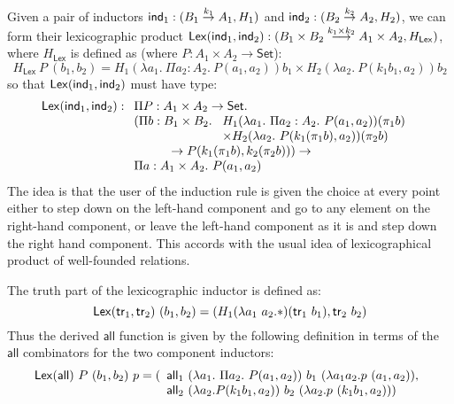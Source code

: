 \documentclass{amsart}
\newcommand{\Set}{\mathsf{Set}}
\begin{document}
Given a pair of inductors $\mathsf{ind}_1 : (B_1 \stackrel{k_1}\to A_1, H_1)$
and $\mathsf{ind}_2 : (B_2 \stackrel{k_2}\to A_2, H_2)$, we can form their
lexicographic product $\mathsf{Lex}(\mathsf{ind}_1, \mathsf{ind}_2) : (B_1 \times B_2
\stackrel{k_1 \times k_2}\longrightarrow A_1 \times A_2,
H_{\mathsf{Lex}})$, where $H_{\mathsf{Lex}}$ is defined as (where $P :
A_1 \times A_2 \to \Set$):
\begin{displaymath}
  H_{\mathsf{Lex}}\ P\ (b_1, b_2) = H_1(\lambda a_1.\ \Pi a_2 : A_2.\ P(a_1, a_2))b_1 \times H_2(\lambda a_2.\ P(k_1 b_1, a_2))b_2
\end{displaymath}
so that $\mathsf{Lex}(\mathsf{ind}_1, \mathsf{ind}_2)$ must have type:
\begin{displaymath}
  \mathsf{Lex}(\ind_1, \ind_2) : 
  \begin{array}[t]{l}
    \Pi P : A_1 \times A_2 \to \Set. \\
    (\Pi b : B_1 \times B_2.\
    \begin{array}[t]{l}
      H_1(\lambda a_1.\ \Pi a_2 : A_2.\ P(a_1, a_2))(\pi_1 b) \\
      \times H_2(\lambda a_2.\ P(k_1(\pi_1 b), a_2))(\pi_2 b)
    \end{array} \\
    \quad\quad\quad\to P (k_1 (\pi_1 b), k_2 (\pi_2 b))) \to \\
    \Pi a : A_1 \times A_2.\ P (a_1, a_2)
  \end{array}
\end{displaymath}
The idea is that the user of the induction rule is given the choice at
every point either to step down on the left-hand component and go to
any element on the right-hand component, or leave the left-hand
component as it is and step down the right hand component. This
accords with the usual idea of lexicographical product of well-founded
relations.

The truth part of the lexicographic inductor is defined as:
\begin{displaymath}
  \mathsf{Lex}(\mathsf{tr}_1, \mathsf{tr}_2)\ (b_1, b_2) = (H_1(\lambda a_1\ a_2. *)(\mathsf{tr}_1\ b_1) , \mathsf{tr}_2\ b_2)
\end{displaymath}
Thus the derived $\mathsf{all}$ function is given by the following
definition in terms of the $\mathsf{all}$ combinators for the two
component inductors:
\begin{displaymath}
  \mathsf{Lex}(\all)\ P\ (b_1,b_2)\ p = (
  \begin{array}[t]{l}
    \all_1\ (\lambda a_1.\ \Pi a_2.\ P(a_1,a_2))\ b_1\ (\lambda a_1 a_2. p\ (a_1,a_2)), \\
    \all_2\ (\lambda a_2. P (k_1 b_1,a_2))\ b_2\ (\lambda a_2. p\ (k_1b_1,a_2)))
  \end{array}
\end{displaymath}
\end{document}
